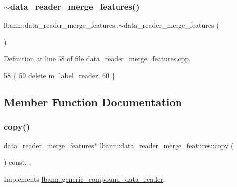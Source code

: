 \subsubsection{\texorpdfstring{$\sim$data\+\_\+reader\+\_\+merge\+\_\+features()}{~data\_reader\_merge\_features()}}
{\footnotesize\ttfamily lbann\+::data\+\_\+reader\+\_\+merge\+\_\+features\+::$\sim$data\+\_\+reader\+\_\+merge\+\_\+features (\begin{DoxyParamCaption}{ }\end{DoxyParamCaption})\hspace{0.3cm}{\ttfamily [override]}}



Definition at line 58 of file data\+\_\+reader\+\_\+merge\+\_\+features.\+cpp.


\begin{DoxyCode}
58                                                         \{
59   \textcolor{keyword}{delete} \hyperlink{classlbann_1_1data__reader__merge__features_a1e54a136c63b934f44ff91dc68ea3b27}{m\_label\_reader};
60 \}
\end{DoxyCode}


\subsection{Member Function Documentation}
\mbox{\label{classlbann_1_1data__reader__merge__features_aa079ec1e03557e2c469f9da6e8aa45a8}} 
\subsubsection{\texorpdfstring{copy()}{copy()}}
{\footnotesize\ttfamily \hyperlink{classlbann_1_1data__reader__merge__features}{data\+\_\+reader\+\_\+merge\+\_\+features}$\ast$ lbann\+::data\+\_\+reader\+\_\+merge\+\_\+features\+::copy (\begin{DoxyParamCaption}{ }\end{DoxyParamCaption}) const\hspace{0.3cm}{\ttfamily [inline]}, {\ttfamily [override]}, {\ttfamily [virtual]}}



Implements \hyperlink{classlbann_1_1generic__compound__data__reader_a197f5fd06679f777a709453830fcc4f9}{lbann\+::generic\+\_\+compound\+\_\+data\+\_\+reader}.



